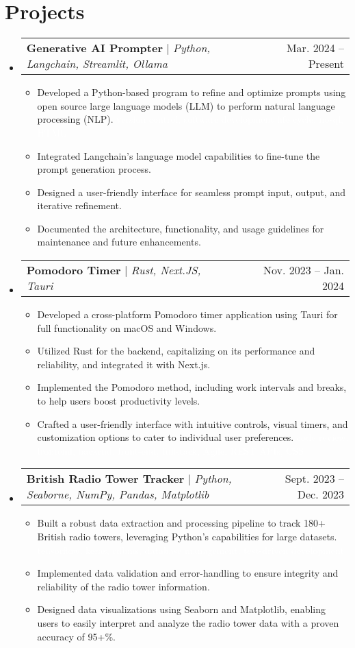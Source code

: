 \documentclass[letterpaper,11pt]{article}
\makeatletter
\newcommand{\resumeItem}[1]{
  \item\small{
    {#1 \vspace{-2pt}}
  }
}
\newcommand{\resumeProjectHeading}[2]{
    \item
    \begin{tabular*}{0.97\textwidth}{l@{\extracolsep{\fill}}r}
      \small#1 & #2 \\
    \end{tabular*}\vspace{-7pt}
}
\newcommand{\resumeSubHeadingListStart}{\begin{itemize}[leftmargin=0.15in, label={}]}
\newcommand{\resumeSubHeadingListEnd}{\end{itemize}}
\newcommand{\resumeItemListStart}{\begin{itemize}}
\newcommand{\resumeItemListEnd}{\end{itemize}\vspace{-5pt}}
\makeatother
\begin{document}
\section{Projects}
    \resumeSubHeadingListStart
      \resumeProjectHeading
          {\textbf{Generative AI Prompter} $|$ \emph{Python, Langchain, Streamlit, Ollama}}{Mar. 2024 -- Present}
          \resumeItemListStart
            \resumeItem{Developed a Python-based program to refine and optimize prompts using open source large language models (LLM) to perform natural language processing (NLP).
            \small{
            \textcolor{white}{
              version control, software development life cycle, nosql, HTML}
              }}
            \resumeItem{Integrated Langchain's language model capabilities to fine-tune the prompt generation process.}
            \resumeItem{Designed a user-friendly interface for seamless prompt input, output, and iterative refinement.}
            \resumeItem{Documented the architecture, functionality, and usage guidelines for maintenance and future enhancements.}
          \resumeItemListEnd
      \resumeProjectHeading
          {\textbf{Pomodoro Timer} $|$ \emph{Rust, Next.JS, Tauri}}{Nov. 2023 -- Jan. 2024}
          \resumeItemListStart
            \resumeItem{Developed a cross-platform Pomodoro timer application using Tauri for full functionality on macOS and Windows.}
            \resumeItem{Utilized Rust for the backend, capitalizing on its performance and reliability, and integrated it with Next.js.}
            \resumeItem{Implemented the Pomodoro method, including work intervals and breaks, to help users boost productivity levels.}
            \resumeItem{Crafted a user-friendly interface with intuitive controls, visual timers, and customization options to cater to individual user preferences.
            \small{
            \textcolor{white}{
              code review, frontend, backend, front-end, fullstack, Agile, REST APIs, CSS}
            }}
         
          \resumeItemListEnd
          \resumeProjectHeading
          {\textbf{British Radio Tower Tracker} $|$ \emph{Python, Seaborne, NumPy, Pandas, Matplotlib}}{Sept. 2023 -- Dec. 2023}
          \resumeItemListStart
          \resumeItem{Built a robust data extraction and processing pipeline to track 180+ British radio towers, leveraging Python's capabilities for large datasets.
          \small{
            \textcolor{white}{
          tensorflow, keras, rdbms, database management, test-driven development
          }
          }}
          \resumeItem{Implemented data validation and error-handling to ensure integrity and reliability of the radio tower information.}
          \resumeItem{Designed data visualizations using Seaborn and Matplotlib, enabling users to easily interpret and analyze the radio tower data with a proven accuracy of 95+\%.}
          \resumeItemListEnd
          \resumeSubHeadingListEnd
          
\end{document}
